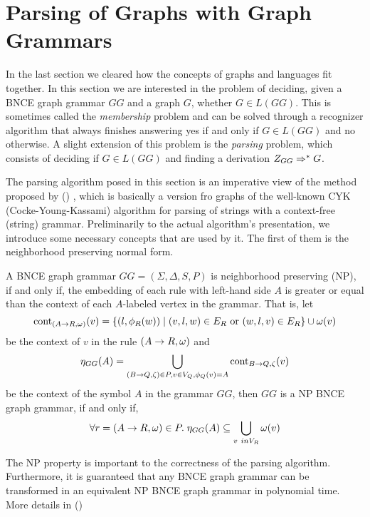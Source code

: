 \section{Parsing of Graphs with Graph Grammars}
In the last section we cleared how the concepts of graphs and languages fit together. In this section we are interested in the problem of deciding, given a BNCE graph grammar $GG$ and a graph $G$, whether $G \in L(GG)$. This is sometimes called the \textit{membership} problem and can be solved through a recognizer algorithm that always finishes answering yes if and only if $G \in L(GG)$ and no otherwise. A slight extension of this problem is the \textit{parsing} problem, which consists of deciding if $G \in L(GG)$ and finding a derivation $Z_{GG} \Rightarrow^*_{} G$.


The parsing algorithm posed in this section is an imperative view of the method proposed by ()%
, which is basically a version fro graphs of the well-known CYK (Cocke-Young-Kassami) algorithm for parsing of strings with a context-free (string) grammar. Preliminarily to the actual algorithm's presentation, we introduce some necessary concepts that are used by it. The first of them is the neighborhood preserving normal form.

\begin{definition}
	\label{def:np}
	A BNCE graph grammar $GG = (\Sigma, \Delta, S, P)$ is neighborhood preserving (NP), if and only if, the embedding of each rule with left-hand side $A$ is greater or equal than the context of each $A$-labeled vertex in the grammar. That is, let 
	\[\operatorname{cont}_{(A \to R,\omega)}(v) =\{(l,\phi_{R}(w)) \; | \; (v,l,w) \in E_R \text { or } (w,l,v) \in E_R \} \cup \omega(v) \]
	be the context of $v$ in the rule $(A \to R,\omega)$ and
	\[\eta_{GG}(A) = \bigcup_{(B \to Q,\zeta) \in P, v \in V_Q, \phi_Q(v) = A} \operatorname{cont}_{B \to Q,\zeta}(v) \] 
	be the context of the symbol $A$ in the grammar $GG$, then $GG$ is a NP BNCE graph grammar, if and only if,
	\[ \forall r = (A \to R,\omega) \in P . \; \eta_{GG}(A) \subseteq \bigcup_{v \ in V_R} \omega(v) \]
\end{definition}

The NP property is important to the correctness of the parsing algorithm. Furthermore, it is guaranteed that any BNCE graph grammar can be transformed in an equivalent NP BNCE graph grammar in polynomial time. More details in () %

